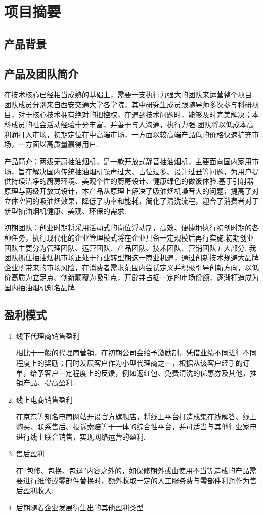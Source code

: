 ﻿\section{项目摘要}
\subsection{产品背景}


\subsection{产品及团队简介}
在技术核心已经相当成熟的基础上，需要一支执行力强大的团队来运营整个项目.
团队成员分别来自西安交通大学各学院，其中研究生成员跟随导师多次参与科研项目，对于核心技术拥有绝对的把控权，在遇到技术问题时，能够及时完美解决；本科成员的社会活动经验十分丰富，并善于与人沟通，执行力强.团队将以低成本高利润打入市场，初期定位在中高端市场，一方面以较高端产品低的价格快速扩充市场，一方面以高质量赢得用户.

产品简介：两级无扇抽油烟机，是一款开放式静音抽油烟机，主要面向国内家用市场，旨在解决国内传统抽油烟机噪声过大、占位过多、设计过丑等问题，为用户提供持续洁净的厨房环境、美观个性的厨房设计、健康绿色的做饭体验.基于引射器原理与两级开放式设计，本产品从原理上解决了吸油烟机噪音大的问题，提高了对立体空间的吸油烟效果，降低了功率和能耗，简化了清洗流程，迎合了消费者对于新型抽油烟机健康、美观、环保的需求.

初期团队：创业时期将采用活动式的岗位浮动制，高效、便捷地执行初创时期的各种任务，执行现代化的企业管理模式将在企业具备一定规模后再行实施.初期创业团队主要分为管理团队、运营团队、产品团队、技术团队、营销团队五大部分.
我团队抓住抽油烟机市场正处于行业转型期这一商业机遇，通过创新技术规避大品牌企业所带来的市场风险，在消费者需求范围内尝试定义并积极引导创新方向，以低价高质为立足点、创新颠覆为吸引点，开辟并占据一定的市场份额，逐渐打造成为国内抽油烟机知名品牌.

\subsection{盈利模式}
\begin{enumerate}
\item 线下代理商销售盈利

      相比于一般的代理商营销，在初期公司会给予激励制，凭借业绩不同进行不同程度上的奖励；同时发展客户作为小型代理商之一，根据从该客户经手的订单，给予客户一定程度上的反馈，例如返红包、免费清洗的优惠券及其他，推销产品、提高盈利.

\item 线上电商销售盈利

      在京东等知名电商网站开设官方旗舰店，将线上平台打造成集在线解答、线上购买、联系售后、投诉索赔等于一体的综合性平台，并可适当与其他行业家电进行线上联合销售，实现网络运营的盈利.

\item 售后盈利

      在“包修、包换、包退”内容之外的，如保修期外或由使用不当等造成的产品需要进行维修或零部件替换时，额外收取一定的人工服务费与零部件利润作为售后盈利收入.

\item 后期随着企业发展衍生出的其他盈利类型
\end{enumerate}

